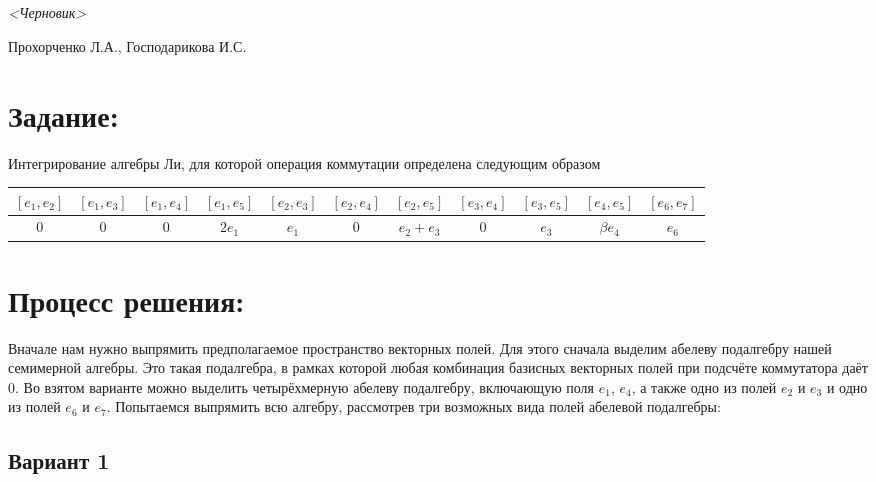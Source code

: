 \documentclass{article}
\begin{document}
\section*{}
\begin{flushleft}
\textit{<Черновик>}
\end{flushleft}
\begin{flushright}
Прохорченко Л.А., Господарикова И.С.
\end{flushright}

\section*{Задание:}
Интегрирование алгебры Ли, для которой операция коммутации определена следующим образом

\begin{table}[h]

\begin{center}
\begin{tabular}{|c|c|c|c|c|c|c|c|c|c|c|}
\hline
$[e_{1},e_{2}]$ & $[e_{1},e_{3}]$ & $[e_{1},e_{4}]$ & \cellcolor{honey} $[e_{1},e_{5}]$ & \cellcolor{honey} $[e_{2},e_{3}]$ & $[e_{2},e_{4}]$ & \cellcolor{honey} $[e_{2},e_{5}]$ & $[e_{3},e_{4}]$ & \cellcolor{honey} $[e_{3},e_{5}]$ & \cellcolor{honey} $[e_{4},e_{5}]$ & \cellcolor{honey} $[e_{6},e_{7}]$ \\
\hline
 $0$ & $0$ & $0$ & $2e_{1}$ &  $e_{1}$ & $0$ & $e_{2}+e_{3}$ & $0$ & $e_{3}$ &  $\beta e_{4}$ &  $e_{6}$ \\
\hline
\end{tabular}
\end{center}
\end{table}

\section*{Процесс решения:}
Вначале нам нужно выпрямить предполагаемое пространство векторных полей. Для этого сначала выделим абелеву подалгебру нашей семимерной алгебры. Это такая подалгебра, в рамках которой любая комбинация базисных векторных полей при подсчёте коммутатора даёт $0$. Во взятом варианте можно выделить четырёхмерную абелеву подалгебру, включающую поля $e_{1}$, $e_{4}$, а также одно из полей $e_{2}$ и $e_{3}$ и одно из полей $e_{6}$ и $e_{7}$. Попытаемся выпрямить всю алгебру, рассмотрев три возможных вида полей абелевой подалгебры:

\subsection*{Вариант 1}
\end{document}
